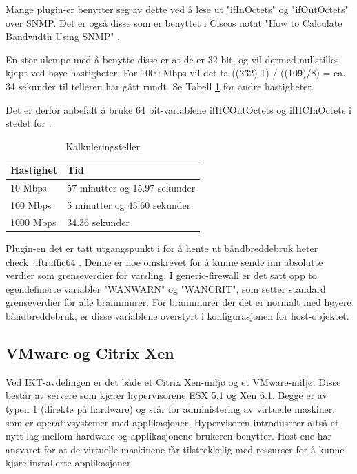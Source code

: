 Mange plugin-er benytter seg av dette ved å lese ut "ifInOctets" og "ifOutOctets" over SNMP. Det er også disse som er benyttet i Ciscos notat "How to Calculate Bandwidth Using SNMP" \cite{ciscobandwidth}. 

En stor ulempe med å benytte disse er at de er 32 bit, og vil dermed nullstilles kjapt ved høye hastigheter. For 1000 Mbps vil det ta ((2\^32)-1) / ((10\^9)/8) = ca. 34 sekunder til telleren har gått rundt. Se Tabell \ref{kalkulering_teller} for andre hastigheter.

Det er derfor anbefalt å bruke 64 bit-variablene ifHCOutOctets og ifHCInOctets i stedet for \cite{ciscosnmpcounters}.
\begin{table}
\begin{center}
\begin{tabular}{ | l | p{7cm} |} \hline
    \textbf{Hastighet} & \textbf{Tid} \\ \hline
    10 Mbps & 57 minutter og 15.97 sekunder \\ \hline
    100 Mbps & 5 minutter og 43.60 sekunder \\ \hline
    1000 Mbps & 34.36 sekunder \\ \hline
\end{tabular}
\caption{Kalkuleringsteller}
\label{kalkulering_teller}
\end{center}
\end{table}
Plugin-en det er tatt utgangspunkt i for å hente ut båndbreddebruk heter check\_iftraffic64 \cite{checkciscoif}. Denne er noe omskrevet for å kunne sende inn absolutte verdier som grenseverdier for varsling. I generic-firewall er det satt opp to egendefinerte variabler "WANWARN" og "WANCRIT", som setter standard grenseverdier for alle brannmurer. For brannmurer der det er normalt med høyere båndbreddebruk, er disse variablene overstyrt i konfigurasjonen for host-objektet.

\subsection{VMware og Citrix Xen}

Ved IKT-avdelingen er det både et Citrix Xen-miljø og et VMware-miljø. Disse består av servere som kjører hypervisorene ESX 5.1 og Xen 6.1. Begge er av typen 1 (direkte på hardware) og står for administering av virtuelle maskiner, som er operativsystemer med applikasjoner. Hypervisoren introduserer altså et nytt lag mellom hardware og applikasjonene brukeren benytter. Host-ene har ansvaret for at de virtuelle maskinene får tilstrekkelig med ressurser for å kunne kjøre installerte applikasjoner. 

